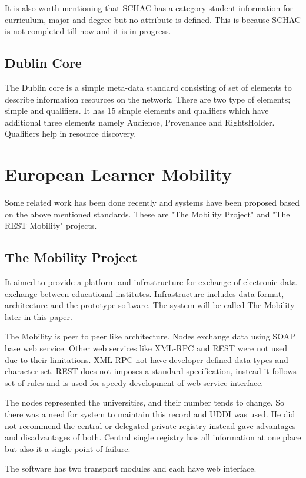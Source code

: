 \documentclass[12pt,a4paper,oneside]{book}
\begin{document}
It is also worth mentioning that SCHAC has a category student information for curriculum, major and degree but no attribute is defined. This is because SCHAC is not completed till now and it is in progress.

    \subsection{Dublin Core}
    The Dublin core is a simple meta-data standard consisting of set of elements to describe information resources on the network. There are two type of elements; simple and qualifiers. It has 15 simple elements and qualifiers which have additional three elements namely Audience, Provenance and RightsHolder. Qualifiers help in resource discovery.

\section{European Learner Mobility}
Some related work has been done recently and systems have been proposed based on the above mentioned standards. These are "The Mobility Project" and "The REST Mobility" projects.

    \subsection{The Mobility Project}
    It aimed to provide a platform and infrastructure for exchange of electronic data exchange between educational institutes. Infrastructure includes data format, architecture and the prototype software. The system will be called The Mobility later in this paper.

    The Mobility is peer to peer like architecture. Nodes exchange data using SOAP base web service. Other web services like XML-RPC and REST were not used due to their limitations. XML-RPC not have developer defined data-types and character set. REST does not imposes a standard specification, instead it follows set of rules and is used for speedy development of web service interface.

    The nodes represented the universities, and their number tends to change. So there was a need for system to maintain this record and UDDI was used. He did not recommend the central or delegated private registry instead gave advantages and disadvantages of both. Central single registry has all information at one place but also it a single point of failure.

    The software has two transport modules and each have web interface.
\end{document}
